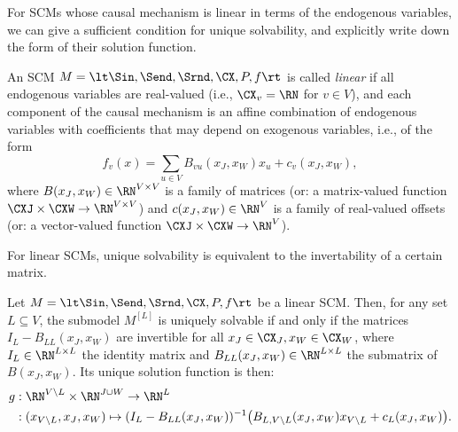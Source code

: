 For SCMs whose causal mechanism is linear in terms of the endogenous variables, we can
give a sufficient condition for unique solvability, and explicitly write down the form
of their solution function.
\begin{Def}\label{def:linear_scms}
An SCM $M=\lt \Sin, \Send, \Srnd, \CX, P, f \rt$ is called \emph{linear} if all
endogenous variables are real-valued (i.e., $\CX_v = \RN$ for $v \in V$), and each
component of the causal mechanism is an affine combination of endogenous variables
with coefficients that may depend on exogenous variables, i.e., of the form
$$
  f_v(x) = \sum_{u\in V} B_{vu}(x_J,x_W) x_u + c_v(x_J,x_W),
$$
where $B(x_J,x_W)\in\RN^{V \times V}$ is a family of matrices (or: a matrix-valued function $\CXJ\times\CXW \to \RN^{V\times V}$) and
$c(x_J,x_W) \in \RN^V$ is a family of real-valued offsets (or: a vector-valued function $\CXJ\times\CXW \to \RN^V$).
\end{Def}
For linear SCMs, unique solvability is equivalent to the invertability of a certain matrix.
\begin{Prp}\label{prp:linear_scms}
Let $M=\lt \Sin, \Send, \Srnd, \CX, P, f \rt$ be a linear SCM.
Then, for any set $L \subseteq V$, the submodel
$M^{[L]}$ is uniquely solvable if and only if the matrices 
$I_{L}-B_{LL}(x_J,x_W)$ are invertible for all $x_J \in \CX_J, x_W \in \CX_W$,
where $I_L \in \RN^{L \times L}$ the identity matrix and 
$B_{LL}(x_J,x_W) \in \RN^{L \times L}$ the submatrix of $B(x_J,x_W)$.
Its unique solution function is then:
  \begin{equation*}\begin{split}
    g &: \RN^{V\setminus L} \times \RN^{J\cup W} \to \RN^L \\
      &: (x_{V\setminus L},x_J,x_W) \mapsto (I_L - B_{LL}(x_J,x_W))^{-1} \big(B_{L,{V\setminus L}}(x_J,x_W) x_{V\setminus L} + c_{L}(x_J,x_W)\big).
  \end{split}\end{equation*}
\end{Prp}

